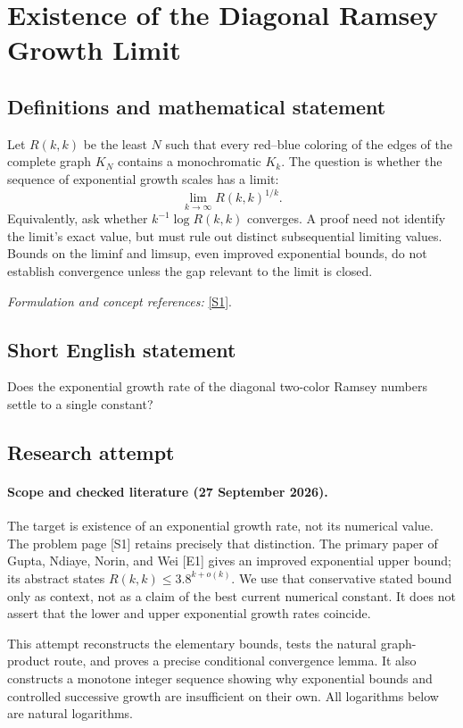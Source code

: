 \documentclass[11pt]{article}
\begin{document}
\section*{\texorpdfstring{Existence of the Diagonal Ramsey Growth Limit}{Existence of the Diagonal Ramsey Growth Limit}}\label{statement}
\subsection{Definitions and mathematical statement}
Let $R(k,k)$ be the least $N$ such that every red--blue coloring of the edges of the complete graph $K_N$ contains a monochromatic $K_k$. The question is whether the sequence of exponential growth scales has a limit:
\[
 \lim_{k\to\infty}R(k,k)^{1/k}.
\]
Equivalently, ask whether $k^{-1}\log R(k,k)$ converges. A proof need not identify the limit's exact value, but must rule out distinct subsequential limiting values. Bounds on the liminf and limsup, even improved exponential bounds, do not establish convergence unless the gap relevant to the limit is closed.
\par\smallskip\textit{Formulation and concept references:} \href{https://www.erdosproblems.com/77}{[S1]}.

\subsection{Short English statement}
Does the exponential growth rate of the diagonal two-color Ramsey numbers settle to a single constant?
\subsection{Research attempt}
\paragraph{Scope and checked literature (27 September 2026).}
The target is existence of an exponential growth rate, not its numerical value. The problem page [S1] retains precisely that distinction. The primary paper of Gupta, Ndiaye, Norin, and Wei [E1] gives an improved exponential upper bound; its abstract states $R(k,k)\leq3.8^{k+o(k)}$. We use that conservative stated bound only as context, not as a claim of the best current numerical constant. It does not assert that the lower and upper exponential growth rates coincide.

This attempt reconstructs the elementary bounds, tests the natural graph-product route, and proves a precise conditional convergence lemma. It also constructs a monotone integer sequence showing why exponential bounds and controlled successive growth are insufficient on their own. All logarithms below are natural logarithms.
\end{document}
